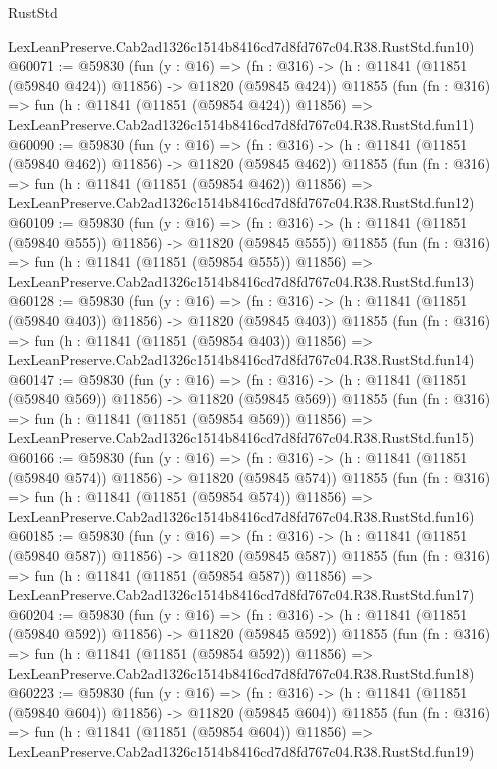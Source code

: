 \begin{lexlean}{RustStd}
\begin{coremodule}
    LexLeanPreserve.Cab2ad1326c1514b8416cd7d8fd767c04.R38.RustStd.fun10)
@60071 := @59830
    (fun (y : @16) =>
    (fn : @316) -> (h : @11841 (@11851 (@59840 @424)) @11856) -> @11820 (@59845 @424))
    @11855
    (fun (fn : @316) =>
    fun (h : @11841 (@11851 (@59854 @424)) @11856) =>
    LexLeanPreserve.Cab2ad1326c1514b8416cd7d8fd767c04.R38.RustStd.fun11)
@60090 := @59830
    (fun (y : @16) =>
    (fn : @316) -> (h : @11841 (@11851 (@59840 @462)) @11856) -> @11820 (@59845 @462))
    @11855
    (fun (fn : @316) =>
    fun (h : @11841 (@11851 (@59854 @462)) @11856) =>
    LexLeanPreserve.Cab2ad1326c1514b8416cd7d8fd767c04.R38.RustStd.fun12)
@60109 := @59830
    (fun (y : @16) =>
    (fn : @316) -> (h : @11841 (@11851 (@59840 @555)) @11856) -> @11820 (@59845 @555))
    @11855
    (fun (fn : @316) =>
    fun (h : @11841 (@11851 (@59854 @555)) @11856) =>
    LexLeanPreserve.Cab2ad1326c1514b8416cd7d8fd767c04.R38.RustStd.fun13)
@60128 := @59830
    (fun (y : @16) =>
    (fn : @316) -> (h : @11841 (@11851 (@59840 @403)) @11856) -> @11820 (@59845 @403))
    @11855
    (fun (fn : @316) =>
    fun (h : @11841 (@11851 (@59854 @403)) @11856) =>
    LexLeanPreserve.Cab2ad1326c1514b8416cd7d8fd767c04.R38.RustStd.fun14)
@60147 := @59830
    (fun (y : @16) =>
    (fn : @316) -> (h : @11841 (@11851 (@59840 @569)) @11856) -> @11820 (@59845 @569))
    @11855
    (fun (fn : @316) =>
    fun (h : @11841 (@11851 (@59854 @569)) @11856) =>
    LexLeanPreserve.Cab2ad1326c1514b8416cd7d8fd767c04.R38.RustStd.fun15)
@60166 := @59830
    (fun (y : @16) =>
    (fn : @316) -> (h : @11841 (@11851 (@59840 @574)) @11856) -> @11820 (@59845 @574))
    @11855
    (fun (fn : @316) =>
    fun (h : @11841 (@11851 (@59854 @574)) @11856) =>
    LexLeanPreserve.Cab2ad1326c1514b8416cd7d8fd767c04.R38.RustStd.fun16)
@60185 := @59830
    (fun (y : @16) =>
    (fn : @316) -> (h : @11841 (@11851 (@59840 @587)) @11856) -> @11820 (@59845 @587))
    @11855
    (fun (fn : @316) =>
    fun (h : @11841 (@11851 (@59854 @587)) @11856) =>
    LexLeanPreserve.Cab2ad1326c1514b8416cd7d8fd767c04.R38.RustStd.fun17)
@60204 := @59830
    (fun (y : @16) =>
    (fn : @316) -> (h : @11841 (@11851 (@59840 @592)) @11856) -> @11820 (@59845 @592))
    @11855
    (fun (fn : @316) =>
    fun (h : @11841 (@11851 (@59854 @592)) @11856) =>
    LexLeanPreserve.Cab2ad1326c1514b8416cd7d8fd767c04.R38.RustStd.fun18)
@60223 := @59830
    (fun (y : @16) =>
    (fn : @316) -> (h : @11841 (@11851 (@59840 @604)) @11856) -> @11820 (@59845 @604))
    @11855
    (fun (fn : @316) =>
    fun (h : @11841 (@11851 (@59854 @604)) @11856) =>
    LexLeanPreserve.Cab2ad1326c1514b8416cd7d8fd767c04.R38.RustStd.fun19)

\end{coremodule}
\end{lexlean}
